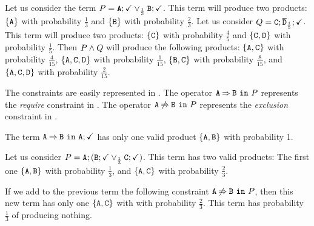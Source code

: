 \begin{example}
  Let us consider the term
  $P=\mathtt{A};\checkmark\mathbin{\lor}_{\frac{1}{3}}{\mathtt{B}};\checkmark$. This
  term will produce two products: $\{{\mathtt{A}}\}$ with probability
  \(\frac{1}{3}\)
  and \(\{{\mathtt{B}}\}\) with probability \(\frac{2}{3}\).
  Let us consider $Q={\mathtt{C}};\overline{\mathtt{D}}_{\frac{1}{5}};\checkmark$. This term will
  produce
  two products: \(\{{\mathtt{C}}\}\) with probability \(\frac{4}{5}\) and
  \(\{{\mathtt{C}},{\mathtt{D}}\}\) with probability \(\frac{1}{5}\).
  Then \(P\mathbin{\wedge} Q\) will produce the following products:
  \(\{{\mathtt{A}},{\mathtt{C}}\}\) with probability \(\frac{4}{15}\),
  \(\{{\mathtt{A}},{\mathtt{C}},{\mathtt{D}}\}\) with probability \(\frac{1}{15}\),
  \(\{{\mathtt{B}},{\mathtt{C}}\}\) with probability \(\frac{8}{15}\), and
  \(\{{\mathtt{A}},{\mathtt{C}},{\mathtt{D}}\}\) with probability \(\frac{2}{15}\).

\end{example}

The constraints are easily represented in \fodaPAp.
The operator $\mathtt{A}\mathbin{\Rightarrow}\mathtt{B}\ \mathtt{in}\ P$ represents the \emph{require}
constraint in \FODA.
The operator $\mathtt{A}\mathbin{\not\Rightarrow}\mathtt{B}\ \mathtt{in}\ P$ represents the \emph{exclusion}
constraint in \FODA.

    \bex
      The term $\mathtt{A}\mathbin{\Rightarrow}\mathtt{B}\ \mathtt{in}\ \mathtt{A};\checkmark$ has only one valid
      product $\{\mathtt{A}, \mathtt{B}\}$ with  probability 1.

      Let us consider
      $P=\mathtt{A};(\mathtt{B};\checkmark\mathbin{\lor}_{\frac{1}{3}}\mathtt{C};\checkmark)$.
      This
      term has two valid products: The first one
      $\{\mathtt{A},\mathtt{B}\}$ with probability $\frac{1}{3}$,
      and $\{\mathtt{A}, \mathtt{C}\}$ with probability $\frac{2}{3}$.

      If we add to the previous term the following constraint
      $\mathtt{A}\mathbin{\not\Rightarrow}\mathtt{B}\ \mathtt{in}\ P$, then this new term  has only one
      $\{\mathtt{A},\mathtt{C}\}$ with  with probability
      $\frac{2}{3}$.
      This term has probability $\frac{1}{3}$ of producing nothing.
    \eex


